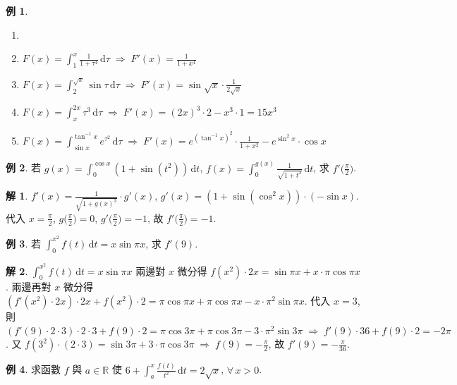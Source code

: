 \documentclass[12pt]{extarticle}
\newcommand{\ds}{\displaystyle}
\newcommand{\ie}{\;\Longrightarrow\;}
\theoremstyle{definition}
\newtheorem*{ex}{例}
\newtheorem*{sol}{解}
\begin{document}
\begin{ex} 
  \begin{enumerate}\setlength{\itemsep}{0pt}
    \item[]
    \item $\ds F(x) = \int_1^x\!\frac{1}{1 + \tau^4}\,\text{d}\tau \ie F'(x) = \frac{1}{1 + x^4}$ 
    \item $\ds F(x) = \int_2^{\sqrt{x}}\!\sin\tau\,\text{d}\tau \ie F'(x) = \sin\sqrt{x}\cdot\frac{1}{2\sqrt{x}}$
    \item $\ds F(x) = \int_{x}^{2x}\!\tau^3\,\text{d}\tau \ie F'(x) = (2x)^3\cdot 2 - x^3\cdot 1 = 15x^3$
    \item $\ds F(x) = \int_{\sin x}^{\tan^{-1}x}\!e^{\tau^2}\,\text{d}\tau \ie F'(x) = e^{(\tan^{-1}x)^2}\cdot\frac{1}{1 + x^2} - e^{\sin^2 x}\cdot\cos x$
  \end{enumerate}
\end{ex}

\begin{ex}
  若 $\ds g(x) = \int_0^{\cos x}\!(1 + \sin(t^2))\,\text{d}t$, $\ds f(x) = \int_0^{g(x)}\!\!\frac{1}{\sqrt{1 + t^3}}\,\text{d}t$, 求 $\ds f'\Big(\frac{\pi}{2}\Big)$. 
\end{ex}

\begin{sol}
  $\ds f'(x) = \frac{1}{\sqrt{1 + g(x)^3}}\cdot g'(x)$, $\ds g'(x) = (1 + \sin(\cos^2 x))\cdot(-\sin x)$. 代入 $\ds x=\frac{\pi}{2}$, $\ds g\Big(\frac{\pi}{2}\Big) = 0$, $\ds g'\Big(\frac{\pi}{2}\Big) = -1$, 故 $\ds f'\Big(\frac{\pi}{2}\Big) = -1$.  
\end{sol}

\begin{ex}
  若 $\ds\int_0^{x^2}\!\! f(t)\,\text{d}t = x\sin\pi x$, 求 $f'(9)$. 
\end{ex}

\begin{sol}
  $\ds\int_0^{x^2}\!\! f(t)\,\text{d}t = x\sin\pi x$ 兩邊對 $x$ 微分得 $\ds f(x^2)\cdot 2x = \sin\pi x + x\cdot\pi\cos\pi x$. 兩邊再對 $x$ 微分得 $\ds (f'(x^2)\cdot 2x)\cdot 2x + f(x^2)\cdot 2 = \pi\cos\pi x + \pi\cos\pi x - x\cdot\pi^2\sin\pi x$. 代入 $x = 3$, 則 $\ds (f'(9)\cdot 2\cdot 3)\cdot 2\cdot 3 + f(9)\cdot 2 = \pi\cos3\pi + \pi\cos3\pi - 3\cdot\pi^2\sin3\pi \ie f'(9)\cdot 36 + f(9)\cdot 2 = -2\pi$. 又 $\ds f(3^2)\cdot(2\cdot 3) = \sin 3\pi + 3\cdot\pi\cos3\pi\ie f(9) = -\frac{\pi}{2}$, 故 $\ds f'(9) = -\frac{\pi}{36}$.  
\end{sol}

\begin{ex}
  求函數 $f$ 與 $a\in\mathbb{R}$ 使 $\ds 6 + \int_a^x\frac{f(t)}{t^2}\,\text{d}t = 2\sqrt{x}$, $\forall\,x > 0$.  
\end{ex}
\end{document}
